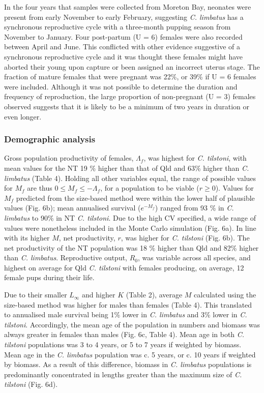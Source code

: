 \documentclass[]{article}
\begin{document}
In the four years that samples were collected from Moreton Bay, neonates
were present from early November to early February, suggesting \emph{C.
limbatus} has a synchronous reproductive cycle with a three-month
pupping season from November to January. Four post-partum (U = 6)
females were also recorded between April and June. This conflicted with
other evidence suggestive of a synchronous reproductive cycle and it was
thought these females might have aborted their young upon capture or
been assigned an incorrect uterus stage. The fraction of mature females
that were pregnant was 22\%, or 39\% if U = 6 females were included.
Although it was not possible to determine the duration and frequency of
reproduction, the large proportion of non-pregnant (U = 3) females
observed suggests that it is likely to be a minimum of two years in
duration or even longer.

\hypertarget{demographic-analysis-1}{%
\subsubsection{Demographic analysis}\label{demographic-analysis-1}}

Gross population productivity of females, \(\Lambda_f\), was highest for
\emph{C. tilstoni}, with mean values for the NT 19 \% higher than that
of Qld and 63\% higher than \emph{C. limbatus} (Table 4). Holding all
other variables equal, the range of possible values for \(M_f\) are thus
\(0 \leq M_f \leq -\Lambda_f\), for a population to be viable
(\(r \geq 0\)). Values for \(M_f\) predicted from the size-based method
were within the lower half of plausible values (Fig. 6b); mean
annualised survival (\(e^{-M_f}\)) ranged from 93 \% in \emph{C.
limbatus} to 90\% in NT \emph{C. tilstoni}. Due to the high CV
specified, a wide range of values were nonetheless included in the Monte
Carlo simulation (Fig. 6a). In line with its higher \(M\), net
productivity, \(r\), was higher for \emph{C. tilstoni} (Fig. 6b). The
net productivity of the NT population was 18 \% higher than Qld and 82\%
higher than \emph{C. limbatus}. Reproductive output, \(R_0\), was
variable across all species, and highest on average for Qld \emph{C.
tilstoni} with females producing, on average, 12 female pups during
their life.

Due to their smaller \(L_\infty\) and higher \(K\) (Table 2), average
\(M\) calculated using the size-based method was higher for males than
females (Table 4). This translated to annualised male survival being 1\%
lower in \emph{C. limbatus} and 3\% lower in \emph{C. tilstoni}.
Accordingly, the mean age of the population in numbers and biomass was
always greater in females than males (Fig. 6c, Table 4). Mean age in
both \emph{C. tilstoni} populations was 3 to 4 years, or 5 to 7 years if
weighted by biomass. Mean age in the \emph{C. limbatus} population was
c. 5 years, or c. 10 years if weighted by biomass. As a result of this
difference, biomass in \emph{C. limbatus} populations is predominantly
concentrated in lengths greater than the maximum size of \emph{C.
tilstoni} (Fig. 6d).
\end{document}

